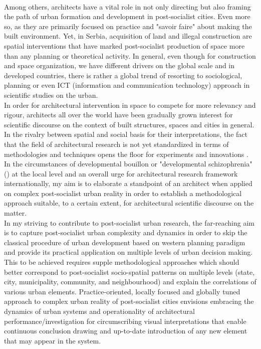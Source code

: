 \documentclass[11pt]{report}
\begin{document}
\\
Among others, architects have a vital role in not only directing but also framing the path of urban formation and development in post-socialist cities. Even more so, as they are primarily focused on practice and "savoir faire" about making the built environment. Yet, in Serbia, acquisition of land and illegal construction are spatial interventions that have marked post-socialist production of space more than any planning or theoretical activity. In general, even though for construction and space organization, we have different drivers on the global scale and in developed countries, there is rather a global trend of resorting to sociological, planning or even ICT (information and communication technology) approach in scientific studies on the urban. 
\\
In order for architectural intervention in space to compete for more relevancy and rigour,  architects all over the world have been gradually grown interest for scientific discourse on the context of built structures, spaces and cities in general.  In the rivalry between spatial and social basis for their interpretations, the fact that the field of architectural research is not yet standardized in terms of methodologies and techniques opens the floor for experiments and innovations \href{ref}{\citealt{ref}}. In the circumstances of developmental bouillon or "developmental schizophrenia"(\href{Vujosevic}{\citealt{Vujosevic}}) at the local level and an overall urge for architectural research framework internationally, my aim is to elaborate a standpoint of an architect when applied on complex post-socialist urban reality in order to establish a methodological approach suitable, to a certain extent, for architectural scientific discourse on the matter.
\\
In my striving to contribute to post-socialist urban research, the far-reaching aim is to capture post-socialist urban complexity and dynamics in order to skip the classical procedure of urban development based on western planning paradigm and provide its practical application on multiple levels of urban decision making. This to be achieved requires supple methodological approaches which should better correspond to post-socialist socio-spatial patterns on multiple levels (state, city, municipality, community, and neighbourhood) and explain the correlations of various urban elements. Practice-oriented, locally focused and globally tuned approach to complex urban reality of post-socialist cities envisions embracing the dynamics of urban systems and operationality of architectural performance/investigation for circumscribing visual interpretations that enable continuous conclusion drawing and up-to-date introduction of any new element that may appear in the system.
\end{document}
